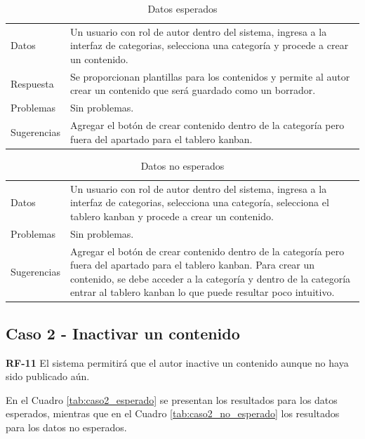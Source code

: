 \documentclass[10pt,times,twocolumn]{article}
\begin{document}
\begin{table}[H]
    \centering
    \begin{tabular}{p{3cm}p{4cm}}
        \rowcolor{gray!15}
        Datos & Un usuario con rol de autor dentro del sistema, ingresa a la interfaz de categorias, selecciona una categoría y procede a crear un contenido. \\
       	Respuesta & Se proporcionan plantillas para los contenidos y permite al autor crear un contenido que será guardado como un borrador. \\
       	Problemas & Sin problemas. \\
       	Sugerencias & Agregar el botón de crear contenido dentro de la categoría pero fuera del apartado para el tablero kanban. \\
    \end{tabular}
    \caption{Datos esperados}
    \label{tab:caso1_esperado}
\end{table}

\begin{table}[H]
    \centering
    \begin{tabular}{p{3cm}p{4cm}}
        \rowcolor{gray!15}
        Datos & Un usuario con rol de autor dentro del sistema, ingresa a la interfaz de categorias, selecciona una categoría, selecciona el tablero kanban y procede a crear un contenido.\\
       	Problemas & Sin problemas. \\
       	Sugerencias & Agregar el botón de crear contenido dentro de la categoría pero fuera del apartado para el tablero kanban. Para crear un contenido, se debe acceder a la categoría y dentro de la categoría entrar al tablero kanban lo que puede resultar poco intuitivo.\\
    \end{tabular}
    \caption{Datos no esperados}
    \label{tab:caso1_no_esperado}
\end{table}

\subsection{Caso 2 - Inactivar un contenido}
\textbf{RF-11} El sistema permitirá que el autor inactive un contenido aunque no haya sido publicado aún.

En el Cuadro \ref{tab:caso2_esperado} se presentan los resultados para los datos esperados, mientras que en el Cuadro \ref{tab:caso2_no_esperado} los resultados para los datos no esperados.
\end{document}
